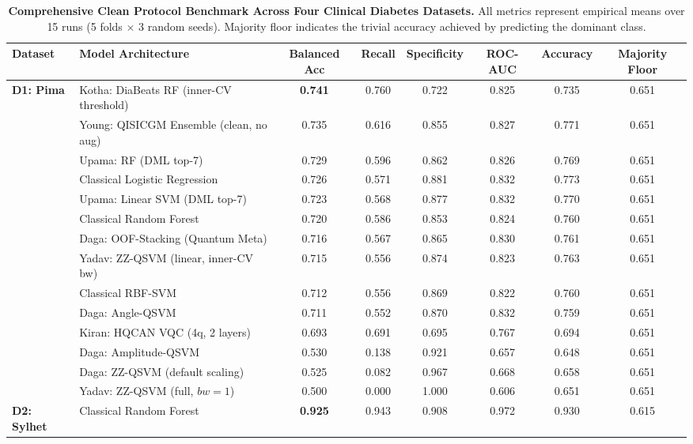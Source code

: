 \documentclass[journal,twocolumn]{IEEEtran}
\begin{document}
\begin{table}[htbp]
\centering\footnotesize
\caption{\textbf{Comprehensive Clean Protocol Benchmark Across Four Clinical Diabetes Datasets.} All metrics represent empirical means over 15 runs (5 folds $\times$ 3 random seeds). Majority floor indicates the trivial accuracy achieved by predicting the dominant class.}
\label{tab:master_results}
\begin{adjustbox}{width=\textwidth}
\begin{tabular}{llcccccc}
\toprule
\textbf{Dataset} & \textbf{Model Architecture} & \textbf{Balanced Acc} & \textbf{Recall} & \textbf{Specificity} & \textbf{ROC-AUC} & \textbf{Accuracy} & \textbf{Majority Floor} \\
\midrule
\multirow{10}{*}{\textbf{D1: Pima}} 
& Kotha: DiaBeats RF (inner-CV threshold) & \textbf{0.741} & 0.760 & 0.722 & 0.825 & 0.735 & 0.651 \\
& Young: QISICGM Ensemble (clean, no aug) & 0.735 & 0.616 & 0.855 & 0.827 & 0.771 & 0.651 \\
& Upama: RF (DML top-7) & 0.729 & 0.596 & 0.862 & 0.826 & 0.769 & 0.651 \\
& Classical Logistic Regression & 0.726 & 0.571 & 0.881 & 0.832 & 0.773 & 0.651 \\
& Upama: Linear SVM (DML top-7) & 0.723 & 0.568 & 0.877 & 0.832 & 0.770 & 0.651 \\
& Classical Random Forest & 0.720 & 0.586 & 0.853 & 0.824 & 0.760 & 0.651 \\
& Daga: OOF-Stacking (Quantum Meta) & 0.716 & 0.567 & 0.865 & 0.830 & 0.761 & 0.651 \\
& Yadav: ZZ-QSVM (linear, inner-CV bw) & 0.715 & 0.556 & 0.874 & 0.823 & 0.763 & 0.651 \\
& Classical RBF-SVM & 0.712 & 0.556 & 0.869 & 0.822 & 0.760 & 0.651 \\
& Daga: Angle-QSVM & 0.711 & 0.552 & 0.870 & 0.832 & 0.759 & 0.651 \\
& Kiran: HQCAN VQC (4q, 2 layers) & 0.693 & 0.691 & 0.695 & 0.767 & 0.694 & 0.651 \\
& Daga: Amplitude-QSVM & 0.530 & 0.138 & 0.921 & 0.657 & 0.648 & 0.651 \\
& Daga: ZZ-QSVM (default scaling) & 0.525 & 0.082 & 0.967 & 0.668 & 0.658 & 0.651 \\
& Yadav: ZZ-QSVM (full, $bw=1$) & 0.500 & 0.000 & 1.000 & 0.606 & 0.651 & 0.651 \\
\midrule
\multirow{9}{*}{\textbf{D2: Sylhet}} 
& Classical Random Forest & \textbf{0.925} & 0.943 & 0.908 & 0.972 & 0.930 & 0.615 \\

\end{tabular}
\end{adjustbox}
\end{table}
\end{document}
